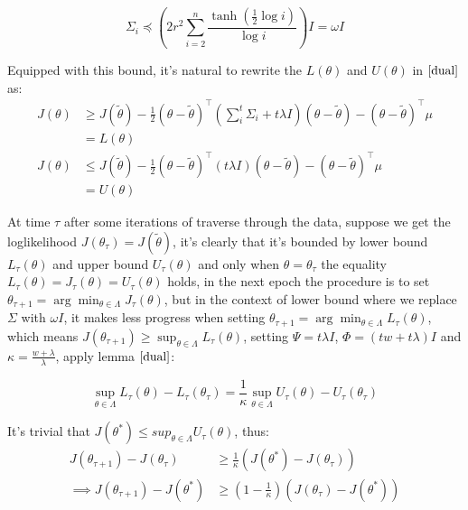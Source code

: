 \documentclass{article}
\begin{document}
\begin{equation}
  \Sigma_i \preceq (2 r^2 \sum_{i=2}^{n} \frac{\tanh(\frac{1}{2}\log i)}{\log i} )I = \omega I
 \end{equation}

 Equipped with this bound, it's natural to rewrite the $L(\theta)$ and $U(\theta)$ in $\ref{dual}$ as:
 \begin{equation}
  \begin{aligned}
     J(\theta)  &\geq J(\tilde{\theta})-\frac{1}{2}(\theta - \tilde{\theta})^{\top} (\sum_i^t \Sigma_i + t\lambda I )(\theta - \tilde{\theta}) - (\theta - \tilde{\theta})^{\top}\mu \\ & =  L(\theta ) \\
    J(\theta)  &\leq J(\tilde{\theta})-\frac{1}{2}(\theta - \tilde{\theta})^{\top} ( t\lambda I )(\theta - \tilde{\theta}) - (\theta - \tilde{\theta})^{\top} \mu \\ & =  U(\theta )
  \end{aligned}
\end{equation}

At time $\tau $ after some iterations of traverse through the data, suppose we get the loglikelihood $J(\theta_{\tau}) = J(\tilde{\theta})$, it's clearly that it's bounded by lower bound $L_{\tau}(\theta)$ and upper bound $U_{\tau}(\theta)$ and
only when $\theta = \theta_{\tau}$ the equality $L_{\tau}(\theta) = J_{\tau}(\theta) =U_{\tau}(\theta)$ holds, in the next epoch the 
procedure is to set $\theta_{\tau+1} = \arg \min_{\theta \in \Lambda} J_{\tau}(\theta)$, but in the context of lower bound where we replace $\Sigma$ with $\omega I$,
it makes less progress when setting $\theta_{\tau+1} = \arg \min_{\theta \in \Lambda} L_{\tau}(\theta)$, which means $J(\theta_{\tau+1}) \geq \sup_{\theta \in \Lambda}L_{\tau}(\theta)$, setting $\Psi = t\lambda I$, $\Phi = (tw+ t\lambda)I$ and $\kappa = \frac{w + \lambda}{\lambda}$, apply lemma $\ref{dual}$:

\begin{equation}
  \sup_{\theta \in \Lambda} L_{\tau}(\theta) - L_{\tau}(\theta_{\tau}) = \frac{1}{\kappa} \sup_{\theta \in \Lambda} U_{\tau}(\theta) - U_{\tau}(\theta_{\tau}) \nonumber
 \end{equation}

 It's trivial that $J(\theta^{*}) \leq sup_{\theta \in \Lambda}U_{\tau}(\theta)$, thus:
 \begin{equation}
  \begin{aligned}
    J(\theta_{\tau+1}) - J(\theta_{\tau}) &\geq \frac{1}{\kappa}(J(\theta^*) - J(\theta_{\tau})) \\
   \implies J(\theta_{\tau+1}) - J(\theta^*) &\geq (1-\frac{1}{\kappa})(J(\theta_{\tau}) - J(\theta^*))   \nonumber
  \end{aligned}
 \end{equation}
\end{document}
